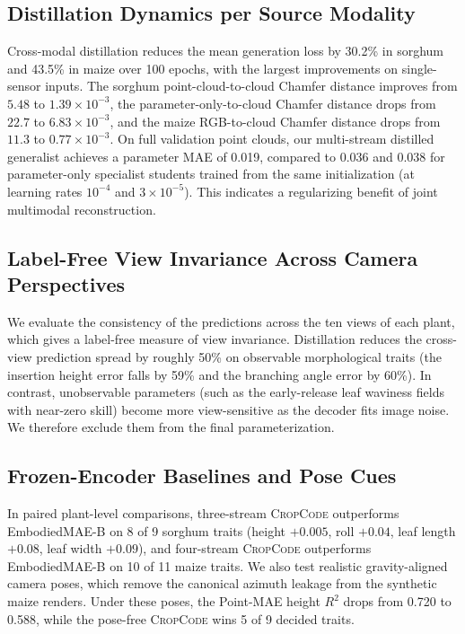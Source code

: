 \documentclass[10pt,twocolumn,letterpaper]{article}
\newcommand{\method}{\textsc{CropCode}}
\begin{document}
\subsection{Distillation Dynamics per Source Modality}
Cross-modal distillation reduces the mean generation loss by 30.2\% in sorghum and 43.5\% in maize over 100 epochs, with the largest improvements on single-sensor inputs. The sorghum point-cloud-to-cloud Chamfer distance improves from $5.48$ to $1.39 \times 10^{-3}$, the parameter-only-to-cloud Chamfer distance drops from $22.7$ to $6.83 \times 10^{-3}$, and the maize RGB-to-cloud Chamfer distance drops from $11.3$ to $0.77 \times 10^{-3}$. On full validation point clouds, our multi-stream distilled generalist achieves a parameter MAE of 0.019, compared to 0.036 and 0.038 for parameter-only specialist students trained from the same initialization (at learning rates $10^{-4}$ and $3 \times 10^{-5}$). This indicates a regularizing benefit of joint multimodal reconstruction.

\subsection{Label-Free View Invariance Across Camera Perspectives}
We evaluate the consistency of the predictions across the ten views of each plant, which gives a label-free measure of view invariance. Distillation reduces the cross-view prediction spread by roughly 50\% on observable morphological traits (the insertion height error falls by 59\% and the branching angle error by 60\%). In contrast, unobservable parameters (such as the early-release leaf waviness fields with near-zero skill) become more view-sensitive as the decoder fits image noise. We therefore exclude them from the final parameterization.

\subsection{Frozen-Encoder Baselines and Pose Cues}
In paired plant-level comparisons, three-stream \method{} outperforms EmbodiedMAE-B on 8 of 9 sorghum traits (height $+0.005$, roll $+0.04$, leaf length $+0.08$, leaf width $+0.09$), and four-stream \method{} outperforms EmbodiedMAE-B on 10 of 11 maize traits. We also test realistic gravity-aligned camera poses, which remove the canonical azimuth leakage from the synthetic maize renders. Under these poses, the Point-MAE height $R^2$ drops from 0.720 to 0.588, while the pose-free \method{} wins 5 of 9 decided traits.
\end{document}
